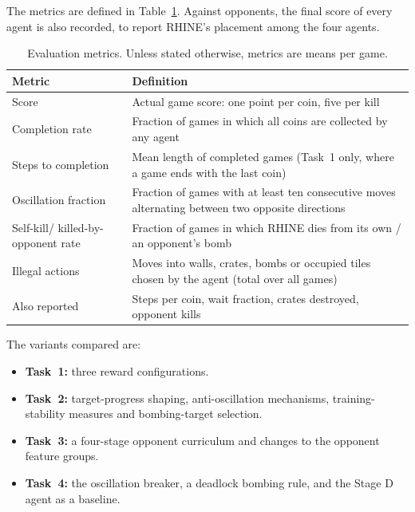 \documentclass[11pt,a4paper]{report}
\begin{document}
	The metrics are defined in Table~\ref{tab:rhine_metrics}. Against opponents, the final score of every agent is also recorded, to report RHINE's placement among the four agents.
	
	\begin{table}[htbp]
		\centering
		\small
		\begin{tabular}{lp{9cm}}
			\toprule
			Metric & Definition \\
			\midrule
			Score & Actual game score: one point per coin, five per kill \\
			Completion rate & Fraction of games in which all coins are collected by any agent \\
			Steps to completion & Mean length of completed games (Task~1 only, where a game ends with the last coin) \\
			Oscillation fraction & Fraction of games with at least ten consecutive moves alternating between two opposite directions \\
			Self-kill/ killed-by-opponent rate & Fraction of games in which RHINE dies from its own / an opponent's bomb \\
			Illegal actions & Moves into walls, crates, bombs or occupied tiles chosen by the agent (total over all games) \\
			Also reported & Steps per coin, wait fraction, crates destroyed, opponent kills \\
			\bottomrule
		\end{tabular}
		\caption{Evaluation metrics. Unless stated otherwise, metrics are means per game.}
		\label{tab:rhine_metrics}
	\end{table}
	
	The variants compared are:
	\begin{itemize}[noitemsep]
		\item \textbf{Task~1:} three reward configurations.
		\item \textbf{Task~2:} target-progress shaping, anti-oscillation mechanisms, training-stability measures and bombing-target selection.
		\item \textbf{Task~3:} a four-stage opponent curriculum and changes to the opponent feature groups.
		\item \textbf{Task~4:} the oscillation breaker, a deadlock bombing rule, and the Stage D agent as a baseline.
	\end{itemize}
	
\end{document}
